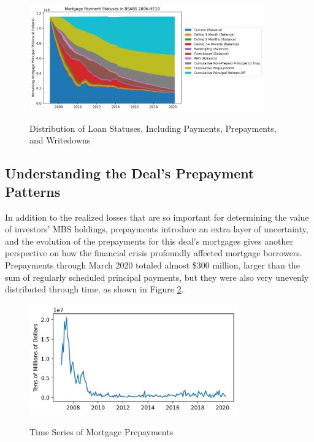 \documentclass[12pt]{article}
\begin{document}
\begin{figure}[h]
	\centering
	\caption{Distribution of Loan Statuses, Including Payments, Prepayments, and Writedowns}
	\includegraphics[width=0.9\textwidth]{../figures/stackplot_delinq_status_with_writeoffs}
	\label{fig:stackplot_delinq_status_with_writeoffs}
\end{figure}

\subsection*{Understanding the Deal's Prepayment Patterns}

In addition to the realized losses that are so important for determining the value of investors’ MBS holdings, prepayments introduce an extra layer of uncertainty, and the evolution of the prepayments for this deal’s mortgages gives another perspective on how the financial crisis profoundly affected mortgage borrowers. Prepayments through March 2020 totaled almost \$300 million, larger than the sum of regularly scheduled principal payments, but they were also very unevenly distributed through time, as shown in Figure \ref{fig:timeseries_prepayments}.

\begin{figure}[h]
	\centering
	\caption{Time Series of Mortgage Prepayments}
	\includegraphics[width=0.8\textwidth]{../figures/timeseries_prepayments}
	\label{fig:timeseries_prepayments}
\end{figure}
\end{document}
